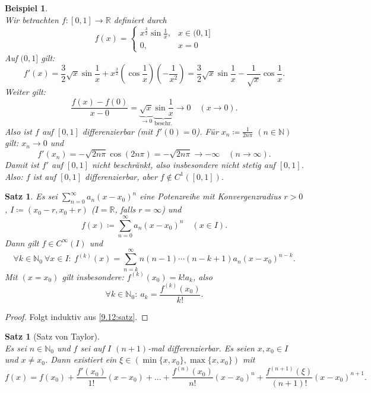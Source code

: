 \documentclass[12pt]{extreport} %
\newcommand{\N}{\mathbb{N}}
\newcommand{\R}{\mathbb{R}}
\theoremstyle{named}
\theoremstyle{itshape}
\newtheorem{satz}[unnamedtheorem]{Satz}
\theoremstyle{normal}
\newtheorem{beispiel}[unnamedtheorem]{Beispiel}
\begin{document}
{\begin{beispiel} \label{9.18:bsp} ~\\
	Wir betrachten $f:[0,1] \to \R$ definiert durch 
	$$f(x) = \begin{cases} x^{\frac{3}{2}} \sin \frac{1}{x}, & x \in (0, 1] \\0, & x = 0 \end{cases}$$
	Auf $(0, 1]$ gilt: 
	$$ f'(x) = \frac{3}{2} \sqrt{x} \sin \frac{1}{x} + x^{\frac{3}{2}} (\cos \frac{1}{x}) (-\frac{1}{x^{2}})
	= \frac{3}{2} \sqrt{x} \sin \frac{1}{x} -  \frac{1}{\sqrt{x}} \cos \frac{1}{x}.$$
	Weiter gilt:
	$$ \frac{f(x) - f(0)}{x - 0} = \underbrace{\sqrt{x}}_{\rightarrow 0} \underbrace{\sin \frac{1}{x}}_{\text{beschr.}} \rightarrow 0 \quad (x \to 0).$$
	Also ist $f$ auf $[0, 1]$ differenzierbar (mit $f'(0) = 0$). Für $x_{n} \coloneqq \frac{1}{2 n \pi}$ $(n \in \N)$ gilt: $x_{n} \rightarrow 0$ und
		$$ f'(x_{n}) = -\sqrt{2 n \pi} \cos(2 n \pi) = -\sqrt{2 n \pi} \to -\infty \quad (n \to \infty). $$ 
	Damit ist $f'$ auf $[0, 1]$ nicht beschränkt, also insbesondere nicht stetig auf $[0,1]$. \\
	Also: $f$ ist auf $[0, 1]$ differenzierbar, aber $f \notin C^{1}([0, 1])$.
\end{beispiel}


\begin{satz} \label{9.19:satz}
	Es sei $\sum_{n=0}^{\infty} a_{n} (x - x_{0})^{n}$ eine Potenzreihe mit Konvergenzradius $r > 0$, $I \coloneqq (x_{0} - r, x_{0} + r)$ ($I = \R$, falls $r = \infty$) und 
	$$ f(x) \coloneqq \sum_{n=0}^{\infty} a_{n} (x - x_{0})^{n} \quad (x \in I). $$
	Dann gilt $f \in C^{\infty}(I)$ und 
	$$\forall k \in \N_{0} ~ \forall x \in I: ~ f^{(k)}(x) = \sum_{n=k}^{\infty} n(n-1) \cdots (n-k+1) a_{n} (x - x_{0})^{n-k}. $$
	Mit $(x = x_{0})$ gilt insbesondere: $f^{(k)}(x_{0}) = k! a_{k}$, also
		$$\forall k \in \N_{0}: ~ a_{k} = \frac{f^{(k)}(x_{0})}{k!}. $$
\end{satz}

\begin{proof}
Folgt induktiv aus \ref{9.12:satz}. 
\end{proof}


\begin{satz}[Satz von Taylor] \label{9.20:satz-Taylor} ~\\
	Es sei $n \in \N_{0}$ und $f$ sei auf $I$ $(n+1)$-mal differenzierbar. Es seien $x, x_{0} \in I$ und $x \neq x_{0}$. Dann existiert ein 
	$\xi \in (\min\{x,x_0\},\max\{x,x_0\}) $ mit
		$$ f(x) = f(x_{0}) + \frac{f'(x_{0})}{1!} (x - x_{0}) + \dotsc + \frac{f^{(n)}(x_{0})}{n!} (x - x_{0})^{n} + \frac{f^{(n+1)}(\xi)}{(n+1)!} (x - x_{0})^{n+1}. $$
\end{satz}

}
\end{document}
